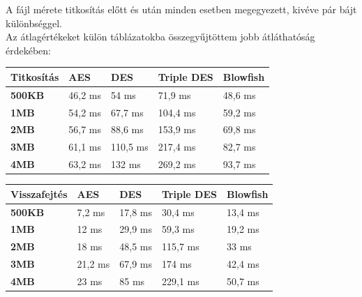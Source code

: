 \newpage \noindent A fájl mérete titkosítás előtt és után minden esetben megegyezett, kivéve pár bájt különbséggel.
\\Az átlagértékeket külön táblázatokba összegyűjtöttem jobb átláthatóság érdekében:

\begin{center}
	
	
	\begin{tabular}{|p{2.4cm}|p{2.7cm}|p{2.7cm}|p{2.7cm}|p{2.7cm}|}
		\hline
		\textbf{Titkosítás}& \textbf{AES} & \textbf{DES} & \textbf{Triple DES}  & \textbf{Blowfish} \\
		\hline
		\textbf{500KB}&46,2 ms&54 ms&71,9 ms&48,6 ms \\
		\hline
		\textbf{1MB}&54,2 ms&67,7 ms&104,4 ms&59,2 ms \\
		\hline
		\textbf{2MB}&56,7 ms&88,6 ms&153,9 ms&69,8 ms \\
		\hline
		\textbf{3MB}&61,1 ms&110,5 ms&217,4 ms&82,7 ms \\
		\hline
		\textbf{4MB}&63,2 ms&132 ms&269,2 ms&93,7 ms \\
		\hline
	\end{tabular}
\end{center}


\begin{center}
	
	
	\begin{tabular}{|p{2.4cm}|p{2.7cm}|p{2.7cm}|p{2.7cm}|p{2.7cm}|}
		\hline
		\textbf{Visszafejtés}& \textbf{AES} & \textbf{DES} & \textbf{Triple DES}  & \textbf{Blowfish} \\
		\hline
		\textbf{500KB}&7,2 ms&17,8 ms&30,4 ms&13,4 ms \\
		\hline
		\textbf{1MB}&12 ms&29,9 ms&59,3 ms&19,2 ms \\
		\hline
		\textbf{2MB}&18 ms&48,5 ms&115,7 ms&33 ms \\
		\hline
		\textbf{3MB}&21,2 ms&67,9 ms&174 ms&42,4 ms \\
		\hline
		\textbf{4MB}&23 ms&85 ms&229,1 ms&50,7 ms \\
		\hline
	\end{tabular}
\end{center}


